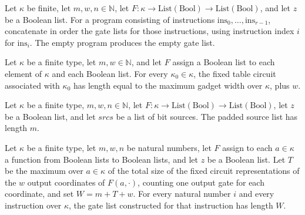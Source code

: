 \begin{definition}
\label{BoolCircuit.tabProgGates}
\leanok
{}
Let $\kappa$ be finite, let $m,w,n\in\mathbb{N}$, let
$F:\kappa\to\mathrm{List}(\mathrm{Bool})\to\mathrm{List}(\mathrm{Bool})$, and let $z$ be
a Boolean list. For a program consisting of instructions
$\mathrm{ins}_0,\ldots,\mathrm{ins}_{r-1}$, concatenate in order the gate lists for
those instructions, using instruction index $i$ for $\mathrm{ins}_i$. The empty program
produces the empty gate list.
\end{definition}

\begin{theorem}
\label{BoolCircuit.length_tabFixed}
\leanok
{}
Let $\kappa$ be a finite type, let $m,w\in\mathbb{N}$, and let $F$ assign a Boolean list
to each element of $\kappa$ and each Boolean list. For every $\kappa_0\in\kappa$, the
fixed table circuit associated with $\kappa_0$ has length equal to the maximum gadget
width over $\kappa$, plus $w$.
\end{theorem}

\begin{theorem}
\label{BoolCircuit.length_padSrc}
\leanok
{}
Let $\kappa$ be a finite type, $m,w,n\in\mathbb{N}$, let
$F:\kappa\to\mathrm{List}(\mathrm{Bool})\to\mathrm{List}(\mathrm{Bool})$, let $z$ be a
Boolean list, and let $srcs$ be a list of bit sources. The padded source list has length
$m$.
\end{theorem}

\begin{theorem}
\label{BoolCircuit.length_tabInstrGates}
\leanok
{}
Let $\kappa$ be a finite type, let $m,w,n$ be natural numbers, let $F$ assign to each
$a\in\kappa$ a function from Boolean lists to Boolean lists, and let $z$ be a Boolean
list. Let $T$ be the maximum over $a\in\kappa$ of the total size of the fixed circuit
representations of the $w$ output coordinates of $F(a,\cdot)$, counting one output gate
for each coordinate, and set $W=m+T+w$. For every natural number $i$ and every
instruction over $\kappa$, the gate list constructed for that instruction has length
$W$.
\end{theorem}


